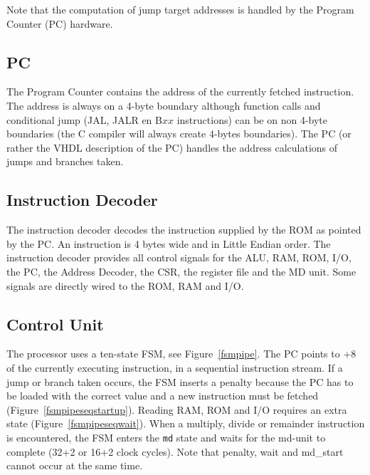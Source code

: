 \documentclass[12pt]{article}
\begin{document}
Note that the computation of jump target addresses is handled by the Program Counter (PC) hardware.

\subsection{PC}
\label{sec:pc}
The Program Counter contains the address of the currently fetched instruction. The address is always on a 4-byte boundary although function calls and conditional jump (JAL, JALR en B$xx$ instructions) can be on non 4-byte boundaries (the C compiler will always create 4-bytes boundaries). The PC (or rather the VHDL description of the PC) handles the address calculations of jumps and branches taken.

\subsection{Instruction Decoder}
\label{sec:instructiondecoder}
The instruction decoder decodes the instruction supplied by the ROM as pointed by the PC. An instruction is 4 bytes wide and in Little Endian order. The instruction decoder provides all control signals for the ALU, RAM, ROM, I/O, the PC, the Address Decoder, the CSR, the register file and the MD unit. Some signals are directly wired to the ROM, RAM and I/O.

\subsection{Control Unit}
The processor uses a ten-state FSM, see Figure~\ref{fsmpipe}. The PC points to +8 of the currently executing instruction, in a sequential instruction stream. If a jump or branch taken occurs, the FSM inserts a penalty because the PC has to be loaded with the correct value and a new instruction must be fetched (Figure~\ref{fsmpipeseqstartup}). Reading RAM, ROM and I/O requires an extra state (Figure~\ref{fsmpipeseqwait}). When a multiply, divide or remainder instruction is encountered, the FSM enters the \texttt{md} state and waits for the md-unit to complete (32+2 or 16+2 clock cycles). Note that penalty, wait and md\_start cannot occur at the same time.
\end{document}
